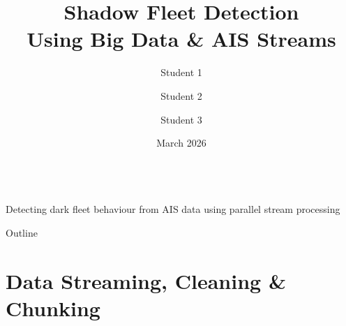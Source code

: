 \documentclass[svgnames, 9pt]{beamer}
\title[Shadow Fleet Detection]{Shadow Fleet Detection\\[0.2em]Using Big Data \& AIS Streams}
\author[Group Name]{Student 1 \and Student 2 \and Student 3}
\institute[VU Amsterdam]{Vrije Universiteit Amsterdam\\ Big Data Engineering}
\date{March 2026}
\begin{document}

\begin{frame}
    \vspace{0.2em}
    \titlepage
    \vspace{-1.5em}
    \begin{center}
        \\[0.2em]
        {\scriptsize\color{midgrey}
            Detecting dark fleet behaviour from AIS data
            using parallel stream processing}
    \end{center}
    \vfill
\end{frame}

\begin{frame}{Outline}
    \small
    \vspace{0.5em}
    \tableofcontents
    \vfill
\end{frame}

\section{Data Streaming, Cleaning \& Chunking}
\end{document}
